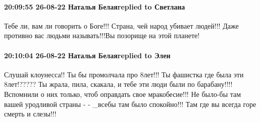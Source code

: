  
 
 
 
 

\paragraph{20:09:55 26-08-22 Наталья Белаяreplied to Светлана}

Тебе ли, вам ли говорить о Боге!!! Страна, чей народ убивает людей!!! Даже
противно вас людьми называть!!!Вы позорище на этой планете!

\paragraph{20:10:04 26-08-22 Наталья Белаяreplied to Элен}

Слушай клоунесса!! Ты бы промолчала про 8лет!!! Ты фашистка где была эти
8лет!????? Ты жрала, пила, скакала, и тебе эти люди были по барабану!!!!
Вспомнили о них только, чтоб оправдать свое мракобесие!!! Не было-бы там вашей
уродливой страны - - _всебы там было спокойно!!! Там где вы всегда горе смерть
и слезы!!!
